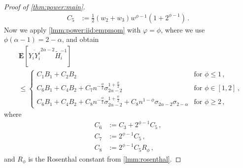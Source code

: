 \documentclass{article}
\newcommand{\lab}{\left[} %
\newcommand{\rab}{\right]} %
\newcommand{\ab}[1]{\lab #1 \rab} %
\newcommand{\abOf}[1]{\!\ab{#1}} %
\newcommand{\lb}{\left(} %
\newcommand{\rb}{\right)} %
\newcommand{\br}[1]{\lb #1 \rb} %
\newcommand{\E}{\mathbf{E}} %
\newcommand{\EOf}[1]{\E\abOf{#1}}
\newcommand{\eqcm}{\,,} %
\newcommand{\eqfs}{\,.}
\newcommand{\ol}[2]{\overline{#1#2}}
\begin{document}
\begin{proof}[Proof of \cref{thm:power:main}]
\begin{align}
        C_5 &:= \frac12 (w_2+w_3) w^{\phi-1} \br{1+2^{\phi-1}}\eqfs
    \end{align}
    Now we apply \cref{lmm:power:iid:empmom} with $\varphi = \phi$, where we use $\phi(\alpha-1) = 2-\alpha$, and obtain
    \begin{align}
        &\EOf{\ol {Y_i}{Y_i^i}^{2\alpha-2}  \tilde H_i^{-1}} 
        \\&\leq 
        \begin{cases}
            C_1 B_1
            +
            C_2 B_2 
            & \text{for }
            \phi \leq 1\eqcm
            \\
            C_6 B_1
            +
            C_4 B_2
            +
            C_7 n^{-\frac\phi2} \sigma_{2\alpha-2}^{1 + \frac\phi2}
            & \text{for }
            \phi \in [1,2]\eqcm
            \\
            C_6 B_1
            +
            C_4 B_2
            +
            C_8 n^{-\frac\phi2} \sigma_{2\alpha-2}^{1 + \frac\phi2}
            +
            C_8 n^{1-\phi} \sigma_{2\alpha-2} \sigma_{2-\alpha}
            & \text{for }
            \phi \geq 2\eqcm
        \end{cases}
    \end{align}
    where
    \begin{align}
        C_6 &:= C_3 + 2^{\phi-1}C_5\eqcm\\ 
        C_7 &:= 2^{\phi-1}C_5\eqcm\\
        C_8 &:= 2^{\phi-1}C_5 R_\phi\eqcm
    \end{align}
    and $R_\phi$ is the Rosenthal constant from \cref{lmm:rosenthal}.
    

\end{proof}
\end{document}
